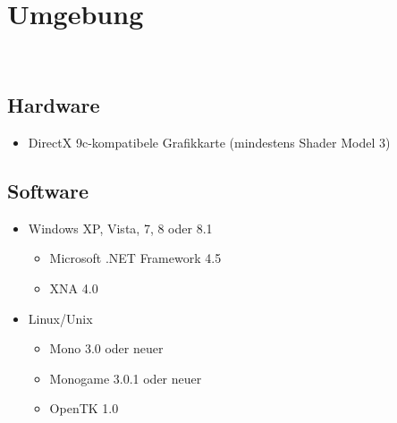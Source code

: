 %
%


\chapter{Umgebung}
\label{UG}~\\



\section{Hardware}

\begin{itemize}
\item DirectX 9c-kompatibele Grafikkarte (mindestens Shader Model 3)
\end{itemize}




\section{Software}

\begin{itemize} 
\item Windows XP, Vista, 7, 8 oder 8.1
\begin{itemize}
\item Microsoft .NET Framework 4.5 
\item XNA 4.0
\end{itemize}
\item Linux/Unix
\begin{itemize}
\item Mono 3.0 oder neuer
\item Monogame 3.0.1 oder neuer
\item OpenTK 1.0
\end{itemize}
\end{itemize}










